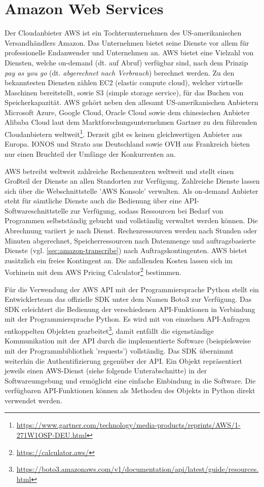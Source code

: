 \section{Amazon Web Services}

Der Cloudanbieter AWS ist ein Tochterunternehmen des US-amerikanischen Versandhändlers Amazon. Das Unternehmen bietet seine Dienste vor allem für professionelle Endanwender und Unternehmen an. AWS bietet eine Vielzahl von Diensten, welche on-demand (dt. auf Abruf) verfügbar sind, nach dem Prinzip \textit{pay as you go} (dt. \textit{abgerechnet nach Verbrauch}) berechnet werden. Zu den bekanntesten Diensten zählen EC2 (elastic compute cloud), welcher virtuelle Maschinen bereitstellt, sowie S3 (simple storage service), für das Buchen von Speicherkapazität. AWS gehört neben den allesamt US-amerikanischen Anbietern Microsoft Azure, Google Cloud, Oracle Cloud sowie dem chinesischen Anbieter Alibaba Cloud laut dem Marktforschungsunternehmen Gartner zu den führenden Cloudanbietern weltweit\footnote{\url{https://www.gartner.com/technology/media-products/reprints/AWS/1-271W1OSP-DEU.html}}. Derzeit gibt es keinen gleichwertigen Anbieter aus Europa. IONOS und Strato aus Deutschland sowie OVH aus Frankreich bieten nur einen Bruchteil der Umfänge der Konkurrenten an.

AWS betreibt weltweit zahlreiche Rechenzentren weltweit und stellt einen Großteil der Dienste an allen Standorten zur Verfügung. Zahlreiche Dienste lassen sich über die Webschnittstelle 'AWS Konsole' verwalten. Als on-demand Anbieter steht für sämtliche Dienste auch die Bedienung über eine API-Softwareschnittstelle zur Verfügung, sodass Ressourcen bei Bedarf von Programmen selbstständig gebucht und vollständig verwaltet werden können. Die Abrechnung variiert je nach Dienst. Rechenressourcen werden nach Stunden oder Minuten abgerechnet, Speicherressourcen nach Datenmenge und auftragsbasierte Dienste (vgl. \autoref{sec:amazon-transcribe}) nach Auftragskontingenten. AWS bietet zusätzlich ein freies Kontingent an. Die anfallenden Kosten lassen sich im Vorhinein mit dem AWS Pricing Calculator\footnote{\url{https://calculator.aws/}} bestimmen. 

Für die Verwendung der AWS API mit der Programmiersprache Python stellt ein Entwicklerteam das offizielle SDK unter dem Namen Boto3 zur Verfügung. Das SDK erleichtert die Bedienung der verschiedenen API-Funktionen in Verbindung mit der Programmiersprache Python. Es wird mit von einzelnen API-Anfragen entkoppelten Objekten gearbeitet\footnote{\url{https://boto3.amazonaws.com/v1/documentation/api/latest/guide/resources.html}}, damit entfällt die eigenständige Kommunikation mit der API durch die implementierte Software (beispielsweise mit der Programmbibliothek 'requests') vollständig. Das SDK übernimmt weiterhin die Authentifizierung gegenüber der API. Ein Objekt repräsentiert jeweils einen AWS-Dienst (siehe folgende Unterabschnitte) in der Softwareumgebung und ermöglicht eine einfache Einbindung in die Software. Die verfügbaren API-Funktionen können als Methoden des Objekts in Python direkt verwendet werden.

